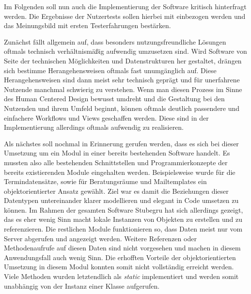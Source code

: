 Im Folgenden soll nun auch die Implementierung der Software kritisch
hinterfragt werden. Die Ergebnisse der Nutzertests sollen hierbei mit
einbezogen werden und das Meinungsbild mit ersten Testerfahrungen bestärken.

Zunächst fällt allgemein auf, dass besonders nutzungsfreundliche Lösungen
oftmals technisch verhältnismäßig aufwendig umzusetzen sind. Wird Software von
Seite der technischen Möglichkeiten und Datenstrukturen her gestaltet, drängen
sich bestimme Herangehensweisen oftmals fast unumgänglich auf. Diese
Herangehensweisen sind dann meist sehr technisch geprägt und für unerfahrene
Nutzende manchmal schwierig zu verstehen. Wenn man diesen Prozess im Sinne des
Human Centered Design bewusst umdreht und die Gestaltung bei den Nutzenden und
ihrem Umfeld beginnt, können oftmals deutlich passendere und einfachere
Workflows und Views geschaffen werden. Diese sind in der Implementierung
allerdings oftmals aufwendig zu realisieren.

Als nächstes soll nochmal in Erinnerung gerufen werden, dass es sich bei dieser
Umsetzung um ein Modul in einer bereits bestehenden Software handelt. Es
mussten also alle bestehenden Schnittstellen und Programmierkonzepte der
bereits existierenden Module eingehalten werden. Beispielsweise wurde für die
Termindatensätze, sowie für Beratungsräume und Mailtemplates ein
objektorientierter Ansatz gewählt. Ziel war es damit die Beziehungen dieser
Datentypen untereinander klarer modellieren und elegant in Code umsetzen zu
können. Im Rahmen der gesamten Software Stubegru hat sich allerdings gezeigt,
das es eher wenig Sinn macht lokale Instanzen von Objekten zu erstellen und zu
referenzieren. Die restlichen Module funktionieren so, dass Daten meist nur vom
Server abgerufen und angezeigt werden. Weitere Referenzen oder Methodenaufrufe
auf diesen Daten sind nicht vorgesehen und machen in diesem Anwendungsfall auch
wenig Sinn. Die erhofften Vorteile der objektorientierten Umsetzung in diesem
Modul konnten somit nicht vollständig erreicht werden. Viele Methoden wurden
letztendlich als \textit{static} implementiert und werden somit unabhängig von
der Instanz einer Klasse aufgerufen.


